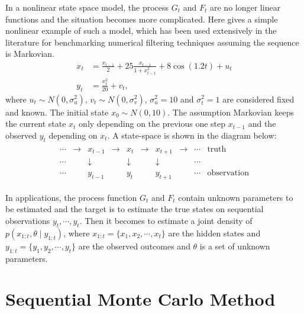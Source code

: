 In a nonlinear state space model, the process $G_t$ and $F_t$ are no longer linear functions and the situation becomes more complicated. Here gives a simple nonlinear example of such a model, which has been used extensively in the literature for benchmarking numerical filtering techniques \cite{kitagawa1996monte} \cite{west1993mixture} \cite{gordon1993novel} assuming the sequence is Markovian.
\begin{align*}
x_t &= \frac{x_{t-1}}{2} +25\frac{x_{t-1}}{1+x_{t-1}^2}+8\cos(1.2t)+u_t\\
y_t &= \frac{x_{t}^2}{20}+v_t,
\end{align*}
where $u_t \sim N(0,\sigma_u^2)$, $v_t \sim N(0,\sigma_v^2)$, $\sigma_u^2=10$ and $\sigma_t^2=1$ are considered fixed and known. The initial state $x_0\sim N(0,10)$. The assumption Markovian keeps the current state $x_t$ only depending on the previous one step $x_{t-1}$ and the observed $y_t$ depending on $x_t$. A state-space is shown in the diagram below:
\begin{align*}
{\displaystyle {\begin{array}{cccccccccc}\cdots &\to &x_{t-1}&\to &x_{t}&\to &x_{t+1}&\to &\cdots &{\text{truth}}\\ \cdots &&\downarrow &&\downarrow &&\downarrow &&\cdots &\\ \cdots&&y_{t-1}&&y_{t}&&y_{t+1}&&\cdots &{\text{observation}}\end{array}}}
\end{align*}

In applications, the process function $G_t$ and $F_t$ contain unknown parameters to be estimated \cite{de1988likelihood} and the target is to estimate the true states on sequential observations $y_t, \cdots, y_t$. Then it becomes to estimate a joint density of $p(x_{1:t},\theta \mid y_{1:t})$, where $x_{1:t} = \{x_1, x_2, \cdots, x_t \}$ are the hidden states and $y_{1:t} = \{y_1, y_2, \cdots, y_t \}$ are the observed outcomes and $\theta$ is a set of unknown parameters. 


\section{Sequential Monte Carlo Method}

